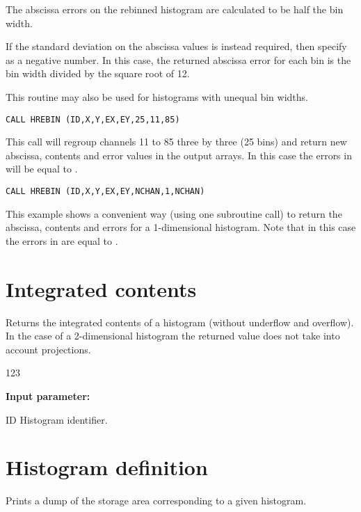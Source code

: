 The abscissa errors on the rebinned histogram are calculated to be
half the bin width.

If the standard deviation on the abscissa values is instead required,
then specify  as a negative number. In this case, the returned
abscissa error for each bin is the bin width divided by the square
root of 12.

This routine may also be used for histograms with unequal bin widths.
\newpage
\Example
\begin{verbatim}
CALL HREBIN (ID,X,Y,EX,EY,25,11,85)
\end{verbatim}
This call will regroup channels 11 to 85 three by three (25 bins)
and return new abscissa, contents and error values in the output arrays.
In this case the errors in  will be equal to .

\begin{verbatim}
CALL HREBIN (ID,X,Y,EX,EY,NCHAN,1,NCHAN)
\end{verbatim}
This example shows a convenient way (using one
subroutine call) to return the abscissa, 
contents and errors for a 1-dimensional histogram. 
Note that
in this case the errors in  are equal to .
 

\section{Integrated contents}
\label{HINTCONT}
 
 
\Action
Returns the integrated contents of a histogram
(without underflow and overflow).
In the case of a 2-dimensional histogram the returned
value does not take into account projections.
 
\begin{DLtt}{123}
\item[{\rm\bf Input parameter:}]
\item[ID] Histogram identifier.
\end{DLtt}

\section{Histogram definition}
\label{HISTADDR}
 
 
\Action
Prints a dump of the  storage area corresponding to a given
histogram.
 
